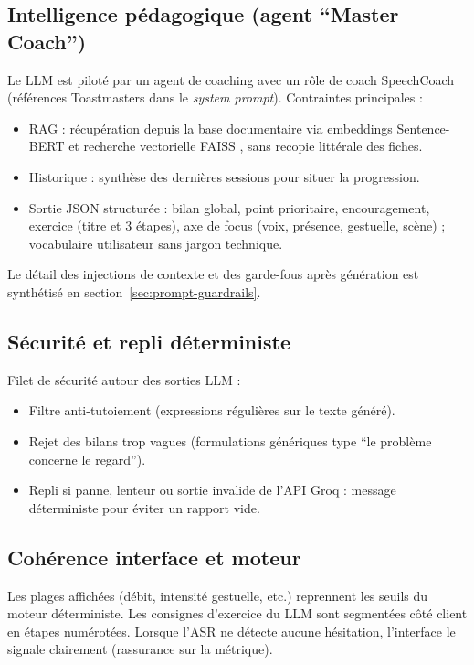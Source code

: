 ﻿\documentclass[12pt,a4paper]{article}
\begin{document}
\subsection{Intelligence pédagogique (agent ``Master Coach'')}
Le LLM est piloté par un agent de coaching avec un rôle de coach SpeechCoach (références Toastmasters dans le \textit{system prompt}). Contraintes principales :
\begin{itemize}
    \item RAG : récupération depuis la base documentaire via embeddings Sentence-BERT \cite{reimers-2019-sentence-bert} et recherche vectorielle FAISS \cite{johnson2019billion}, sans recopie littérale des fiches.
    \item Historique : synthèse des dernières sessions pour situer la progression.
    \item Sortie JSON structurée : bilan global, point prioritaire, encouragement, exercice (titre et 3 étapes), axe de focus (voix, présence, gestuelle, scène) ; vocabulaire utilisateur sans jargon technique.
\end{itemize}
Le détail des injections de contexte et des garde-fous après génération est synthétisé en section~\ref{sec:prompt-guardrails}.

\subsection{Sécurité et repli déterministe}
Filet de sécurité autour des sorties LLM :
\begin{itemize}
    \item Filtre anti-tutoiement (expressions régulières sur le texte généré).
    \item Rejet des bilans trop vagues (formulations génériques type ``le problème concerne le regard'').
    \item Repli si panne, lenteur ou sortie invalide de l'API Groq : message déterministe pour éviter un rapport vide.
\end{itemize}

\subsection{Cohérence interface et moteur}
Les plages affichées (débit, intensité gestuelle, etc.) reprennent les seuils du moteur déterministe. Les consignes d'exercice du LLM sont segmentées côté client en étapes numérotées. Lorsque l'ASR ne détecte aucune hésitation, l'interface le signale clairement (rassurance sur la métrique).
\end{document}
